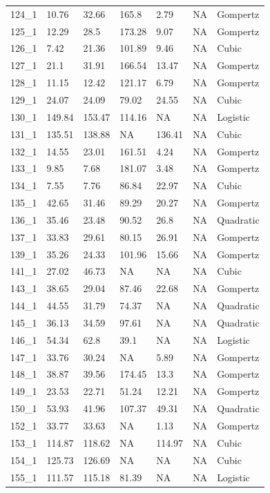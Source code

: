 \documentclass[titlepage]{article}
\begin{document}
\begin{longtable}{lllllll}
124\_1 & 10.76 & 32.66 & 165.8 & 2.79 & NA & Gompertz \\
125\_1 & 12.29 & 28.5 & 173.28 & 9.07 & NA & Gompertz \\
126\_1 & 7.42 & 21.36 & 101.89 & 9.46 & NA & Cubic \\
127\_1 & 21.1 & 31.91 & 166.54 & 13.47 & NA & Gompertz \\
128\_1 & 11.15 & 12.42 & 121.17 & 6.79 & NA & Gompertz \\
129\_1 & 24.07 & 24.09 & 79.02 & 24.55 & NA & Cubic \\
130\_1 & 149.84 & 153.47 & 114.16 & NA & NA & Logistic \\
131\_1 & 135.51 & 138.88 & NA & 136.41 & NA & Cubic \\
132\_1 & 14.55 & 23.01 & 161.51 & 4.24 & NA & Gompertz \\
133\_1 & 9.85 & 7.68 & 181.07 & 3.48 & NA & Gompertz \\
134\_1 & 7.55 & 7.76 & 86.84 & 22.97 & NA & Cubic \\
135\_1 & 42.65 & 31.46 & 89.29 & 20.27 & NA & Gompertz \\
136\_1 & 35.46 & 23.48 & 90.52 & 26.8 & NA & Quadratic \\
137\_1 & 33.83 & 29.61 & 80.15 & 26.91 & NA & Gompertz \\
139\_1 & 35.26 & 24.33 & 101.96 & 15.66 & NA & Gompertz \\
141\_1 & 27.02 & 46.73 & NA & NA & NA & Cubic \\
143\_1 & 38.65 & 29.04 & 87.46 & 22.68 & NA & Gompertz \\
144\_1 & 44.55 & 31.79 & 74.37 & NA & NA & Quadratic \\
145\_1 & 36.13 & 34.59 & 97.61 & NA & NA & Quadratic \\
146\_1 & 54.34 & 62.8 & 39.1 & NA & NA & Logistic \\
147\_1 & 33.76 & 30.24 & NA & 5.89 & NA & Gompertz \\
148\_1 & 38.87 & 39.56 & 174.45 & 13.3 & NA & Gompertz \\
149\_1 & 23.53 & 22.71 & 51.24 & 12.21 & NA & Gompertz \\
150\_1 & 53.93 & 41.96 & 107.37 & 49.31 & NA & Quadratic \\
152\_1 & 33.77 & 33.63 & NA & 1.13 & NA & Gompertz \\
153\_1 & 114.87 & 118.62 & NA & 114.97 & NA & Cubic \\
154\_1 & 125.73 & 126.69 & NA & NA & NA & Cubic \\
155\_1 & 111.57 & 115.18 & 81.39 & NA & NA & Logistic \\

\end{longtable}
\end{document}
